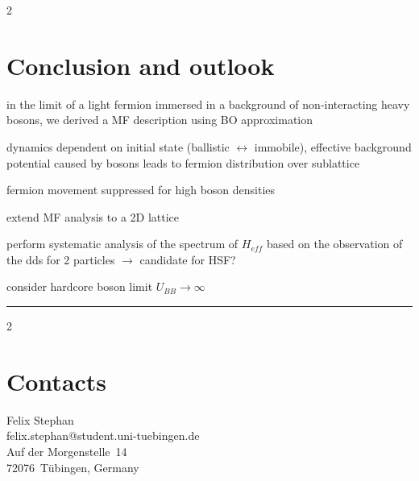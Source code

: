 \documentclass[a0,plainsections]{sciposter}
\begin{document}
\begin{multicols}{2}
	\section{Conclusion and outlook}
	\begin{AutoMultiColItemize}
		\renewcommand\labelitemi{\textcolor{rot}{$\rightarrow$}}
		\item in the limit of a light fermion immersed in a background of non-interacting heavy bosons, we derived a MF description using BO approximation
		\item [$\rightarrow$] dynamics dependent on initial state (ballistic $\leftrightarrow$ immobile), effective background potential caused by bosons leads to fermion distribution over sublattice
		\item [$\rightarrow$] fermion movement suppressed for high boson densities 
		\item extend MF analysis to a 2D lattice
		\item perform systematic analysis of the spectrum of $H_{eff}$ based on the observation of the dds for 2 particles $\rightarrow$ candidate for HSF?
		\item consider hardcore boson limit $U_{BB}\rightarrow \infty$
	\end{AutoMultiColItemize}
\end{multicols}

\vspace*{+100pt}
\textcolor{rot}{\rule{\textwidth}{4pt}}
\setlength{\columnseprule}{0pt}
\begin{multicols}{2}
	\vspace*{-70pt}
	\printbibliography[heading=customBibTitle]
	\vspace*{-10pt}

	\section*{Contacts}
	{\small
		Felix Stephan\\
		felix.stephan@student.uni-tuebingen.de\\
		Auf der Morgenstelle~14\\
		72076~Tübingen, Germany
	}
\end{multicols}
\end{document}
